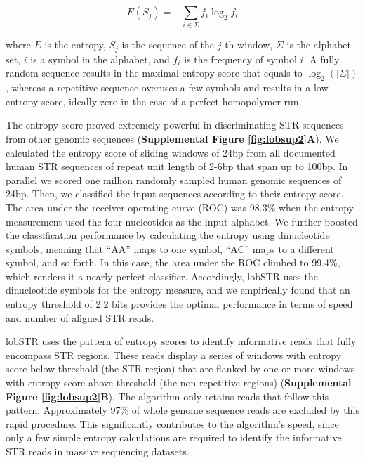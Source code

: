 \begin{equation}
E(S_j) = -\sum_{i \in \Sigma}f_i \log_2 f_i
\end{equation}

where $E$ is the entropy, $S_j$ is the sequence of the $j$-th window, $\Sigma$ is the alphabet set, $i$ is a symbol in the alphabet, and $f_i$ is the frequency of symbol $i$. A fully random sequence results in the maximal entropy score that equals to $\log_2(|\Sigma|)$, whereas a repetitive sequence overuses a few symbols and results in a low entropy score, ideally zero in the case of a perfect homopolymer run.

The entropy score proved extremely powerful in discriminating STR sequences from other genomic sequences (\textbf{Supplemental Figure \ref{fig:lobsup2}A}). We calculated the entropy score of sliding windows of 24bp from all documented human STR sequences of repeat unit length of 2-6bp that span up to 100bp. In parallel we scored one million randomly sampled human genomic sequences of 24bp. Then, we classified the input sequences according to their entropy score. The area under the receiver-operating curve (ROC) was 98.3\% when the entropy measurement used the four nucleotides as the input alphabet. We further boosted the classification performance by calculating the entropy using dinucleotide symbols, meaning that “AA” maps to one symbol, “AC” maps to a different symbol, and so forth. In this case, the area under the ROC climbed to 99.4\%, which renders it a nearly perfect classifier. Accordingly, lobSTR uses the dinucleotide symbols for the entropy measure, and we empirically found that an entropy threshold of 2.2 bits provides the optimal performance in terms of speed and number of aligned STR reads.

lobSTR uses the pattern of entropy scores to identify informative reads that fully encompass STR regions. These reads display a series of windows with entropy score below-threshold (the STR region) that are flanked by one or more windows with entropy score above-threshold (the non-repetitive regions) (\textbf{Supplemental Figure \ref{fig:lobsup2}B}). The algorithm only retains reads that follow this pattern. Approximately 97\% of whole genome sequence reads are excluded by this rapid procedure. This significantly contributes to the algorithm's speed, since only a few simple entropy calculations are required to identify the informative STR reads in massive sequencing datasets.

